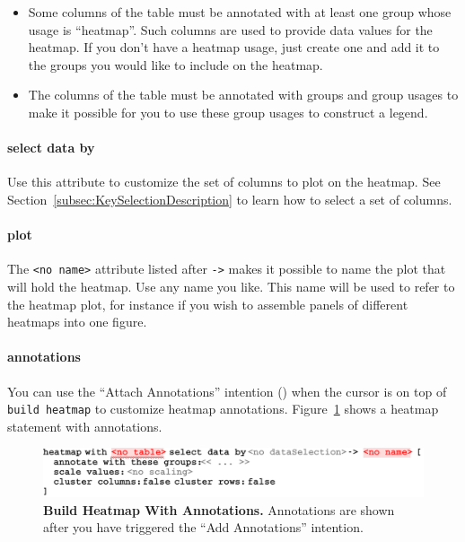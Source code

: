 \begin{itemize}
  \item Some columns of the table must be annotated with at least one group whose usage is ``heatmap''. Such columns are used to provide data values for the heatmap. If you don't have a heatmap usage, just create one and add it to the groups you would like to include on the heatmap.
  \item The columns of the table must be annotated with groups and group usages to make it possible for you to use these group usages to construct a legend.
\end{itemize}

\paragraph{select data by}
Use this attribute to customize the set of columns to plot on the heatmap. See Section~\ref{subsec:KeySelectionDescription} to learn how to select a set of columns.

\paragraph{plot}
The \texttt{<no name>} attribute listed after \texttt{->} makes it possible to name the plot that will hold the heatmap. Use any name you like. This name will be used to refer to the heatmap plot, for instance if you wish to assemble panels of different heatmaps into one figure.

\paragraph{annotations}
You can use the ``Attach Annotations'' intention (\intentionLightBulb) when the cursor is on top of \texttt{build heatmap} to customize heatmap annotations. Figure~\ref{fig:BuildHeatmapWithAnnotations} shows a heatmap statement with annotations.

\begin{figure}[h!tbp]
  \centering
  \includegraphics[width=\figWidthWide]{figures/NewBuildHeatmapWithAnnotations.pdf}
\caption[Build Heatmap With Annotations.]{\textbf{Build Heatmap With Annotations.} Annotations are shown after you have triggered the ``Add Annotations'' intention.}
\label{fig:BuildHeatmapWithAnnotations}
\end{figure}

